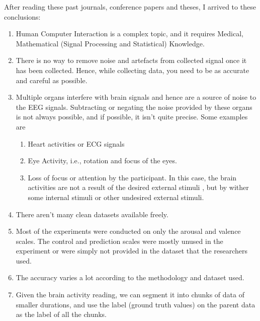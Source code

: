 \begin{enumerate}
After reading these past journals, conference papers and theses, I arrived to these conclusions:
\begin{enumerate}
    \item Human Computer Interaction is a complex topic, and it requires Medical, Mathematical (Signal Processing and Statistical) Knowledge.
    \item There is no way to remove noise and artefacts from collected signal once it has been collected. Hence, while collecting data, you need to be as accurate and careful as possible.
    \item Multiple organs interfere with brain signals and hence are a source of noise to the EEG signals. Subtracting or negating the noise provided by these organs is not always possible, and if possible, it isn't quite precise. Some examples are 
    \begin{enumerate}
        \item Heart activities or ECG signals
        \item Eye Activity, i.e., rotation and focus of the eyes.
        \item Loss of focus or attention by the participant. In this case, the brain activities are not a result of the desired external stimuli , but by wither some internal stimuli or other undesired external stimuli.
    \end{enumerate}
    \item There aren't many clean datasets available freely.
    \item Most of the experiments were conducted on only the arousal and valence scales. The control and prediction scales were mostly unused in the experiment or were simply not provided in the dataset that the researchers used.
    \item The accuracy varies a lot according to the methodology and dataset used.
    \item Given the brain activity reading, we can segment it into chunks of data of smaller durations, and use the label (ground truth values) on the parent data as the label of all the chunks.\cite{window}
\end{enumerate}
\end{enumerate}
